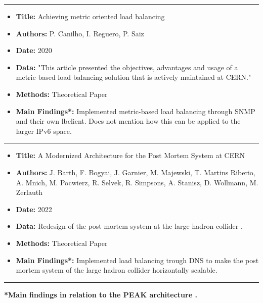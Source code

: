 \documentclass[12pt]{article}
\begin{document}
\noindent\rule{\textwidth}{0.4pt}
\begin{itemize}
    \item \textbf{Title:} Achieving metric oriented load balancing \cite{canilhoAchievingMetricOriented2020}
    \item \textbf{Authors:} P. Canilho, I. Reguero, P. Saiz
    \item \textbf{Date:} 2020
    \item \textbf{Data:} "This article presented the objectives, advantages and usage of a metric-based load balancing solution that is actively maintained at CERN." \cite{canilhoAchievingMetricOriented2020}
    \item \textbf{Methods:} Theoretical Paper
    \item \textbf{Main Findings*:} Implemented metric-based load balancing through SNMP and their own lbclient. Does not mention how this can be applied to the larger IPv6 space.
\end{itemize}
\noindent\rule{\textwidth}{0.4pt}
\begin{itemize}
    \item \textbf{Title:} A Modernized Architecture for the Post Mortem System at CERN \cite{barthModernizedArchitecturePost2022}
    \item \textbf{Authors:} J. Barth, F. Bogyai, J. Garnier, M. Majewski, T. Martins Riberio, A. Mnich, M. Pocwierz, R. Selvek, R. Simpsons, A. Stanisz, D. Wollmann, M. Zerlauth
    \item \textbf{Date:} 2022
    \item \textbf{Data:} Redesign of the post mortem system at the large hadron collider \cite{barthModernizedArchitecturePost2022}.
    \item \textbf{Methods:} Theoretical Paper
    \item \textbf{Main Findings*:} Implemented load balancing trough DNS to make the post mortem system of the large hadron collider horizontally scalable.
\end{itemize}
\noindent\rule{\textwidth}{0.4pt}
\textbf{*Main findings in relation to the PEAK architecture \cite{heimonenPreprintPEAKProxy2024}.}
\end{document}
